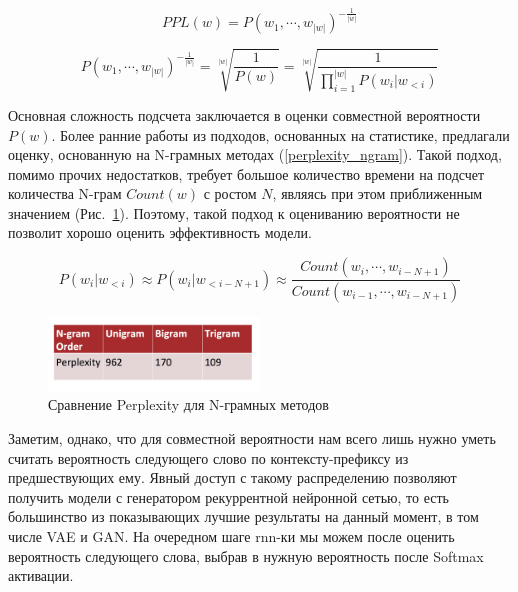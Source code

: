 \documentclass{spbau-diploma}
\begin{document}
\begin{equation}
\label{perplexity}
PPL(w) = P(w_1, \cdots, w_{|w|}) ^ {-\frac{1}{|w|}}
\end{equation}

\begin{equation}
\label{perplexity_exp}
P(w_1, \cdots, w_{|w|}) ^ {-\frac{1}{|w|}} = \sqrt[|w|]{\frac{1}{P(w)}} = 
\sqrt[|w|]{\frac{1}{\prod^{|w|}_{i=1}{P(w_i | w_{<i})}}}
\end{equation}

Основная сложность подсчета заключается в оценки совместной вероятности $P(w)$.
Более ранние работы из подходов, основанных на статистике, предлагали оценку, 
основанную на N-грамных методах (\ref{perplexity_ngram}). Такой подход, помимо
прочих недостатков, требует большое количество времени на подсчет количества 
N-грам $Count(w)$ с ростом $N$, являясь при этом приближенным значением 
(Рис.~{\ref{ngram_comp}}). Поэтому, такой подход к оцениванию вероятности не
позволит хорошо оценить эффективность модели.

\begin{equation}
\label{perplexity_ngram}
P(w_i | w_{<i}) \approx P(w_i | w_{<i-N+1}) 
\approx \frac{Count(w_i, \cdots, w_{i-N+1})}{Count(w_{i-1}, \cdots, w_{i-N+1})}
\end{equation}

\begin{figure}
\centering
\includegraphics[width=0.5\textwidth]{images/ngram_comp.png}
\caption{Сравнение Perplexity для N-грамных методов}
\label{ngram_comp}
\end{figure}

Заметим, однако, что для совместной вероятности нам всего лишь нужно уметь 
считать вероятность следующего слово по контексту-префиксу из предшествующих 
ему. Явный доступ с такому распределению позволяют получить модели с 
генератором рекуррентной нейронной сетью, то есть большинство из показывающих
лучшие результаты на данный момент, в том числе VAE и GAN. На очередном шаге
rnn-ки мы можем после оценить вероятность следующего слова, выбрав в нужную
вероятность после Softmax активации.
\end{document}
